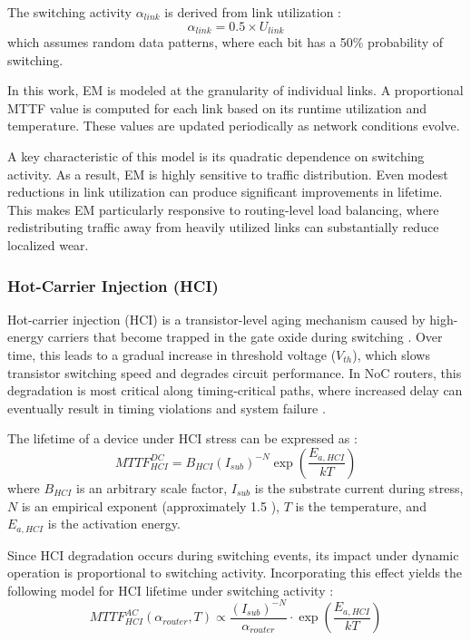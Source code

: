 The switching activity $\alpha_{link}$ is derived from link utilization \cite{Clotho2015}:
\begin{equation}
\alpha_{link} = 0.5 \times U_{link}
\end{equation}
which assumes random data patterns, where each bit has a 50\% probability of switching.

In this work, EM is modeled at the granularity of individual links. A proportional MTTF value is computed for each link based on its runtime utilization and temperature. These values are updated periodically as network conditions evolve.

A key characteristic of this model is its quadratic dependence on switching activity. As a result, EM is highly sensitive to traffic distribution. Even modest reductions in link utilization can produce significant improvements in lifetime. This makes EM particularly responsive to routing-level load balancing, where redistributing traffic away from heavily utilized links can substantially reduce localized wear.

\subsubsection{Hot-Carrier Injection (HCI)}

Hot-carrier injection (HCI) is a transistor-level aging mechanism caused by high-energy carriers that become trapped in the gate oxide during switching \cite{JEDEC122G}. Over time, this leads to a gradual increase in threshold voltage ($V_{th}$), which slows transistor switching speed and degrades circuit performance. In NoC routers, this degradation is most critical along timing-critical paths, where increased delay can eventually result in timing violations and system failure \cite{Clotho2015}.

The lifetime of a device under HCI stress can be expressed as \cite{JEDEC122G}:
\begin{equation}
MTTF_{HCI}^{DC} = B_{HCI} (I_{sub})^{-N} \exp\left(\frac{E_{a,HCI}}{kT}\right)
\end{equation}
where $B_{HCI}$ is an arbitrary scale factor, $I_{sub}$ is the substrate current during stress, $N$ is an empirical exponent (approximately 1.5 \cite{Clotho2015}), $T$ is the temperature, and $E_{a,HCI}$ is the activation energy.

Since HCI degradation occurs during switching events, its impact under dynamic operation is proportional to switching activity. Incorporating this effect yields the following model for HCI lifetime under switching activity \cite{Clotho2015}:
\begin{equation}
MTTF_{HCI}^{AC}(\alpha_{router}, T) \propto \frac{(I_{sub})^{-N}}{\alpha_{router}} \cdot \exp\left(\frac{E_{a,HCI}}{kT}\right)
\end{equation}

